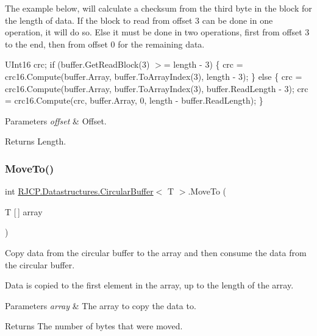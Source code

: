 The example below, will calculate a checksum from the third byte in the block for the length of data. If the block to read from offset 3 can be done in one operation, it will do so. Else it must be done in two operations, first from offset 3 to the end, then from offset 0 for the remaining data.

U\+Int16 crc; if (buffer.\+Get\+Read\+Block(3) $>$= length -\/ 3) \{ crc = crc16.\+Compute(buffer.\+Array, buffer.\+To\+Array\+Index(3), length -\/ 3); \} else \{ crc = crc16.\+Compute(buffer.\+Array, buffer.\+To\+Array\+Index(3), buffer.\+Read\+Length -\/ 3); crc = crc16.\+Compute(crc, buffer.\+Array, 0, length -\/ buffer.\+Read\+Length); \} 


\begin{DoxyParams}{Parameters}
{\em offset} & Offset.\\
\hline
\end{DoxyParams}
\begin{DoxyReturn}{Returns}
Length.
\end{DoxyReturn}
\mbox{\label{class_r_j_c_p_1_1_datastructures_1_1_circular_buffer_ad7524ae69bbcbca58bfba02c65ea9cf8}} 
\subsubsection{\texorpdfstring{MoveTo()}{MoveTo()}\hspace{0.1cm}{\footnotesize\ttfamily [1/2]}}
{\footnotesize\ttfamily int \mbox{\hyperlink{class_r_j_c_p_1_1_datastructures_1_1_circular_buffer}{R\+J\+C\+P.\+Datastructures.\+Circular\+Buffer}}$<$ T $>$.Move\+To (\begin{DoxyParamCaption}\item[{T \mbox{[}$\,$\mbox{]}}]{array }\end{DoxyParamCaption})}



Copy data from the circular buffer to the array and then consume the data from the circular buffer. 

Data is copied to the first element in the array, up to the length of the array. 


\begin{DoxyParams}{Parameters}
{\em array} & The array to copy the data to.\\
\hline
\end{DoxyParams}
\begin{DoxyReturn}{Returns}
The number of bytes that were moved.
\end{DoxyReturn}
\mbox{\label{class_r_j_c_p_1_1_datastructures_1_1_circular_buffer_a2c5705e46e1d21a18b6213caad9d00b0}} 
